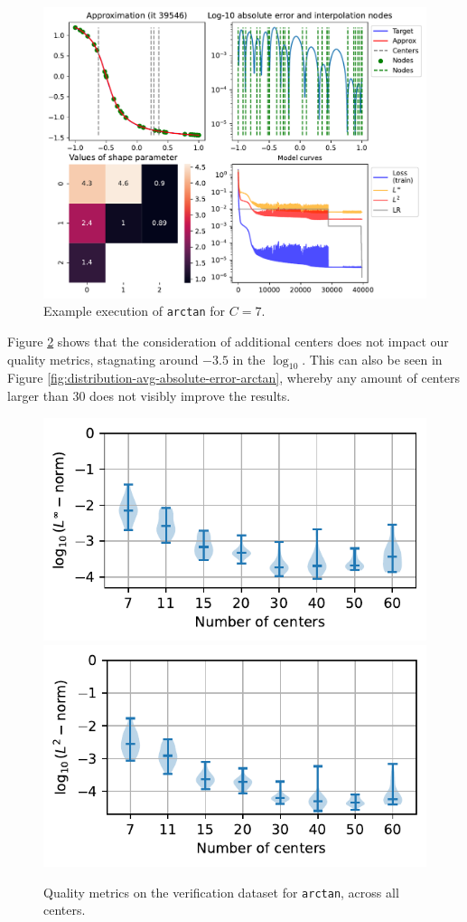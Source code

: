 \documentclass[12pt]{report} %
\begin{document}
\begin{figure}
  \includegraphics[width=\textwidth]{imagenes/experiments/1d/statistical_1d_full_scheduler_interpolation/arctan_paper/arctan_paper-TR28-C7-Kgaussian_kernel-Sh0.78125-18-E39546.pdf}
  \caption{Example execution of \texttt{arctan} for $C=7$.}
  \label{fig:example-execution-arctan}
\end{figure}

Figure \ref{fig:violins-l-arctan} shows that the consideration of additional centers does not impact our quality metrics, stagnating around $-3.5$ in the $\log_{10}$. This can also be seen in Figure \ref{fig:distribution-avg-absolute-error-arctan}, whereby any amount of centers larger than $30$ does not visibly improve the results.

\begin{figure}
  \includegraphics[width=.45\textwidth]{imagenes/experiments/1d/statistical_1d_full_scheduler_interpolation/arctan_paper/violins_linf_arctan_paper_endgame_2.pdf}
  \includegraphics[width=.45\textwidth]{imagenes/experiments/1d/statistical_1d_full_scheduler_interpolation/arctan_paper/violins_l2_arctan_paper_endgame.pdf}
  \caption{Quality metrics on the verification dataset for \texttt{arctan}, across all centers.}
  \label{fig:violins-l-arctan}
\end{figure}
\end{document}
